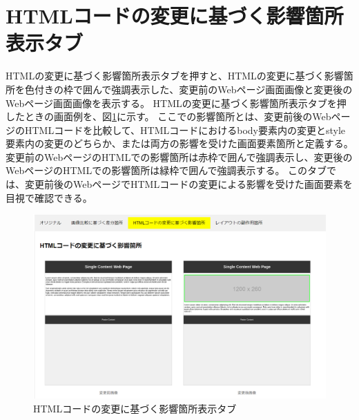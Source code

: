 \section{HTMLコードの変更に基づく影響箇所表示タブ}\label{subsec:html_tab}
HTMLの変更に基づく影響箇所表示タブを押すと、HTMLの変更に基づく影響箇所を色付きの枠で囲んで強調表示した、変更前のWebページ画面画像と変更後のWebページ画面画像を表示する。
HTMLの変更に基づく影響箇所表示タブを押したときの画面例を、図\ref{fig: Appearance_html_tab}に示す。
ここでの影響箇所とは、変更前後のWebページのHTMLコードを比較して、HTMLコードにおけるbody要素内の変更とstyle要素内の変更のどちらか、または両方の影響を受けた画面要素箇所と定義する。
変更前のWebページのHTMLでの影響箇所は赤枠で囲んで強調表示し、変更後のWebページのHTMLでの影響箇所は緑枠で囲んで強調表示する。
このタブでは、変更前後のWebページでHTMLコードの変更による影響を受けた画面要素を目視で確認できる。
\begin{figure}[tp]
	\begin{center}
		\includegraphics[width=1.0\columnwidth]{image/3_html_tab.png}
		\caption{HTMLコードの変更に基づく影響箇所表示タブ}
		\label{fig: Appearance_html_tab}
	\end{center}
\end{figure}



